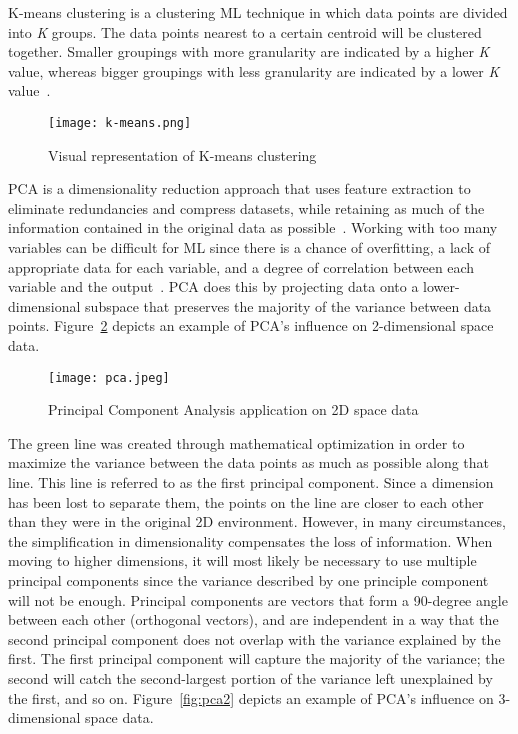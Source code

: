K-means clustering is a clustering \gls{ML} technique in which data points are divided into \textit{K} groups. The data points nearest to a certain centroid will be clustered together. Smaller groupings with more granularity are indicated by a higher \textit{K} value, whereas bigger groupings with less granularity are indicated by a lower \textit{K} value~\cite{2020WhatIBMb}.
    
\begin{figure}[htbp]
    \centering
    \texttt{[image: k-means.png]}
    \caption{Visual representation of K-means clustering~\cite{Beaumont2020ImageMedium}}
    \label{fig:k-means}
\end{figure}

\gls{PCA} is a dimensionality reduction approach that uses feature extraction to eliminate redundancies and compress datasets, while retaining as much of the information contained in the original data as possible~\cite{2020WhatIBMb}. Working with too many variables can be difficult for \gls{ML} since there is a chance of overfitting, a lack of appropriate data for each variable, and a degree of correlation between each variable and the output~\cite{Chugh2018TypesKnow}. \gls{PCA} does this by projecting data onto a lower-dimensional subspace that preserves the majority of the variance between data points. Figure~\ref{fig:pca} depicts an example of \gls{PCA}'s influence on 2-dimensional space data.

\begin{figure}[htbp]
    \centering
    \texttt{[image: pca.jpeg]}
    \caption{Principal Component Analysis application on 2D space data~\cite{Patcher2014WhatDNA}}
    \label{fig:pca}
\end{figure}

The green line was created through mathematical optimization in order to maximize the variance between the data points as much as possible along that line. This line is referred to as the first principal component. Since a dimension has been lost to separate them, the points on the line are closer to each other than they were in the original 2D environment. However, in many circumstances, the simplification in dimensionality compensates the loss of information. When moving to higher dimensions, it will most likely be necessary to use multiple principal components since the variance described by one principle component will not be enough. Principal components are vectors that form a 90-degree angle between each other (orthogonal vectors), and are independent in a way that the second principal component does not overlap with the variance explained by the first. The first principal component will capture the majority of the variance; the second will catch the second-largest portion of the variance left unexplained by the first, and so on. Figure~\ref{fig:pca2} depicts an example of \gls{PCA}'s influence on 3-dimensional space data.

